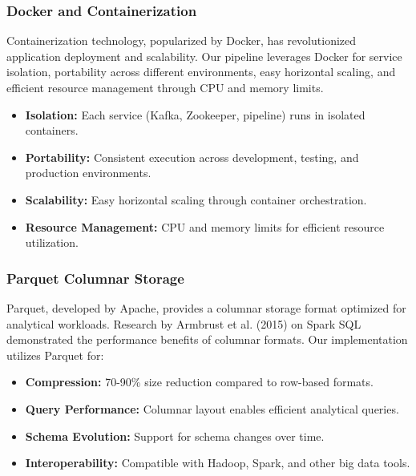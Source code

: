 \documentclass[12pt,a4paper]{article}
\begin{document}
\subsubsection{Docker and Containerization}

Containerization technology, popularized by Docker, has revolutionized application deployment and scalability. Our pipeline leverages Docker for service isolation, portability across different environments, easy horizontal scaling, and efficient resource management through CPU and memory limits.

\begin{itemize}
    \item \textbf{Isolation:} Each service (Kafka, Zookeeper, pipeline) runs in isolated containers.
    
    \item \textbf{Portability:} Consistent execution across development, testing, and production environments.
    
    \item \textbf{Scalability:} Easy horizontal scaling through container orchestration.
    
    \item \textbf{Resource Management:} CPU and memory limits for efficient resource utilization.
\end{itemize}

\subsubsection{Parquet Columnar Storage}

Parquet, developed by Apache, provides a columnar storage format optimized for analytical workloads. Research by Armbrust et al. (2015) on Spark SQL demonstrated the performance benefits of columnar formats. Our implementation utilizes Parquet for:

\begin{itemize}
    \item \textbf{Compression:} 70-90\% size reduction compared to row-based formats.
    
    \item \textbf{Query Performance:} Columnar layout enables efficient analytical queries.
    
    \item \textbf{Schema Evolution:} Support for schema changes over time.
    
    \item \textbf{Interoperability:} Compatible with Hadoop, Spark, and other big data tools.
\end{itemize}
\end{document}
